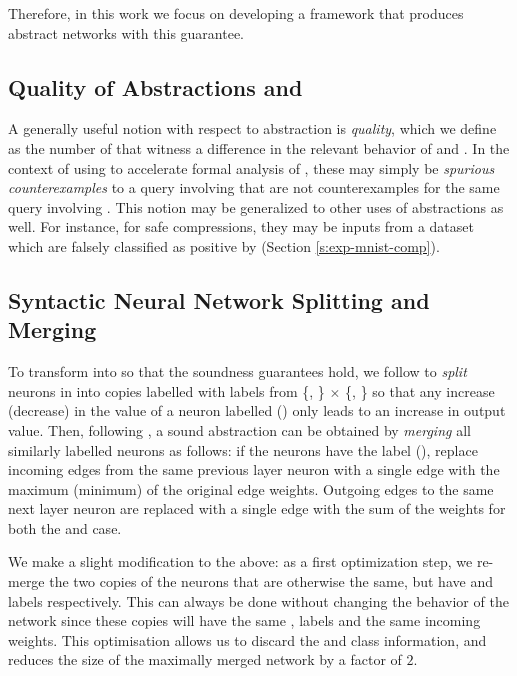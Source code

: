 Therefore, in this work we focus on developing a framework that produces
abstract networks with this guarantee.

\subsection{Quality of Abstractions and \gencex}
\label{s:qual}

A generally useful notion with respect to abstraction is \textit{quality},
which we define as the number of \textit{\gencex} that witness a difference in
the relevant behavior of \abs and \cnc. In the context of using \abs to
accelerate formal analysis of \dnn, these \gencex may simply be
\textit{spurious counterexamples} \cite{cegar-nn, cleverest-nn} to a query
involving \abs that are not counterexamples for the same query involving \cnc.
This notion may be generalized to other uses of abstractions as well. For
instance, for safe compressions, they may be inputs from a dataset which
are falsely classified as positive by \abs (Section \ref{s:exp-mnist-comp}).

\subsection{Syntactic Neural Network Splitting and Merging}
\label{s:nn-sam}

To transform \cnc into \abs so that the soundness guarantees hold, we follow
\cite{cegar-nn} to \textit{split} neurons in \cnc into copies labelled with
labels from \{\inc, \dec\} $\times$ \{\posc, \negc\} so that any
increase (decrease) in the value of a neuron labelled
\inc (\dec) only leads to an increase in output value. Then,
following \cite{cegar-nn}, a sound abstraction can be obtained by
\textit{merging} all similarly labelled neurons as follows: if the neurons have
the label \inc (\dec), replace incoming edges from the same
previous layer neuron with a single edge with the maximum (minimum) of the
original edge weights. Outgoing edges to the same next layer neuron are replaced
with a single edge with the sum of the weights for both the \inc and \dec case.


We make a slight modification to the above: as a first optimization step, we
re-merge the two copies of the \abs neurons that are otherwise the same, but
have \posc and \negc labels respectively. This can always be done without
changing the behavior of the network since these copies will have the same \inc,
\dec labels and the same incoming weights.  This optimisation
allows us to discard the \posc and \negc class information, and reduces the size
of the maximally merged network by a factor of $2$.

